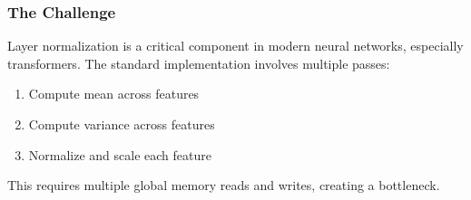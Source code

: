 \subsubsection{The Challenge}

Layer normalization is a critical component in modern neural networks, especially transformers. The standard implementation involves multiple passes:
\begin{enumerate}
    \item Compute mean across features
    \item Compute variance across features
    \item Normalize and scale each feature
\end{enumerate}

This requires multiple global memory reads and writes, creating a bottleneck.

